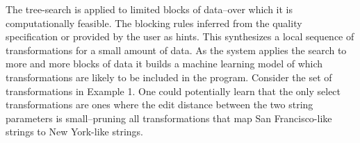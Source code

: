 The tree-search is applied to limited blocks of data--over which it is computationally feasible. The blocking rules inferred from the quality specification or provided by the user as hints.
This synthesizes a local sequence of transformations for a small amount of data.
As the system applies the search to more and more blocks of data it builds a machine learning model of which transformations are likely to be included in the program.
Consider the set of transformations in Example 1. One could potentially learn that the only select transformations are ones where the edit distance between the two string parameters is small--pruning all transformations that map San Francisco-like strings to New York-like strings.


